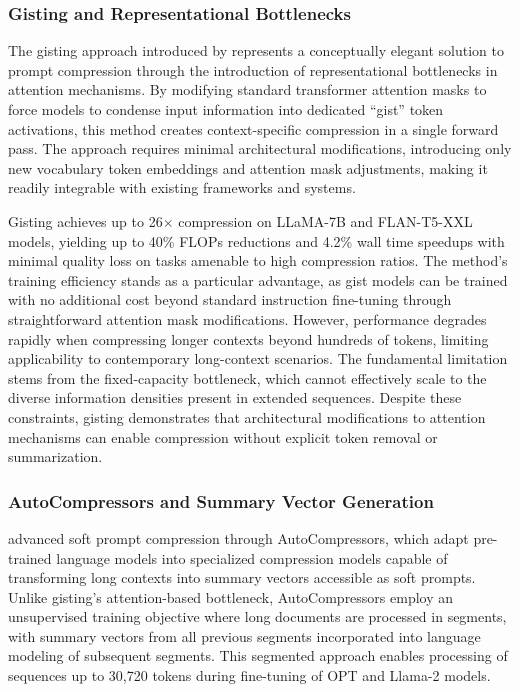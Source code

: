 \subsubsection{Gisting and Representational Bottlenecks}

The gisting approach introduced by \citet{mu2023learning} represents a conceptually elegant solution to prompt compression through the introduction of representational bottlenecks in attention mechanisms. By modifying standard transformer attention masks to force models to condense input information into dedicated ``gist'' token activations, this method creates context-specific compression in a single forward pass. The approach requires minimal architectural modifications, introducing only new vocabulary token embeddings and attention mask adjustments, making it readily integrable with existing frameworks and systems.

Gisting achieves up to 26$\times$ compression on LLaMA-7B and FLAN-T5-XXL models, yielding up to 40\% FLOPs reductions and 4.2\% wall time speedups with minimal quality loss on tasks amenable to high compression ratios. The method's training efficiency stands as a particular advantage, as gist models can be trained with no additional cost beyond standard instruction fine-tuning through straightforward attention mask modifications. However, performance degrades rapidly when compressing longer contexts beyond hundreds of tokens, limiting applicability to contemporary long-context scenarios. The fundamental limitation stems from the fixed-capacity bottleneck, which cannot effectively scale to the diverse information densities present in extended sequences. Despite these constraints, gisting demonstrates that architectural modifications to attention mechanisms can enable compression without explicit token removal or summarization.

\subsubsection{AutoCompressors and Summary Vector Generation}

\citet{chevalier2023adapting} advanced soft prompt compression through AutoCompressors, which adapt pre-trained language models into specialized compression models capable of transforming long contexts into summary vectors accessible as soft prompts. Unlike gisting's attention-based bottleneck, AutoCompressors employ an unsupervised training objective where long documents are processed in segments, with summary vectors from all previous segments incorporated into language modeling of subsequent segments. This segmented approach enables processing of sequences up to 30,720 tokens during fine-tuning of OPT and Llama-2 models.

